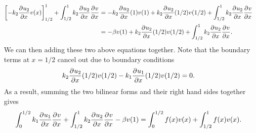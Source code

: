 {\begin{solution}
\begin{enumerate}
\begin{align*}
\left[-k_2\frac{\partial^{} u_2}{\partial x^{}}v(x)\right]_{1/2}^{1} + \int_{1/2}^1 k_2 \frac{\partial^{} u_2}{\partial x^{}}\frac{\partial^{} v}{\partial x^{}} &= -k_2\frac{\partial^{} u_2}{\partial x^{}}(1)v(1) + k_2\frac{\partial^{} u_2}{\partial x^{}}(1/2)v(1/2) + \int_{1/2}^1k_2 \frac{\partial^{} u_2}{\partial x^{}}\frac{\partial^{} v}{\partial x^{}}\\
&= -\beta v(1) + k_2\frac{\partial^{} u_2}{\partial x^{}}(1/2)v(1/2) + \int_{1/2}^1k_2 \frac{\partial^{} u_2}{\partial x^{}}\frac{\partial^{} v}{\partial x^{}}.
 \end{align*}
We can then adding these two above equations together.  Note that the boundary terms at $x = 1/2$ cancel out due to boundary conditions
\[
k_2\frac{\partial^{} u_2}{\partial x^{}}(1/2)v(1/2) -k_1\frac{\partial^{} u_1}{\partial x^{}}(1/2)v(1/2) = 0.
\]
As a result, summing the two bilinear forms and their right hand sides together gives 
\[
\int_0^{1/2}k_1 \frac{\partial^{} u_1}{\partial x^{}}\frac{\partial^{} v}{\partial x^{}}  + \int_{1/2}^1k_2 \frac{\partial^{} u_2}{\partial x^{}}\frac{\partial^{} v}{\partial x^{}} -\beta v(1) = \int_0^{1/2} f(x) v(x) + \int_{1/2}^{1} f(x) v(x).
\]

 \end{enumerate}
 \end{solution}
}{}
 